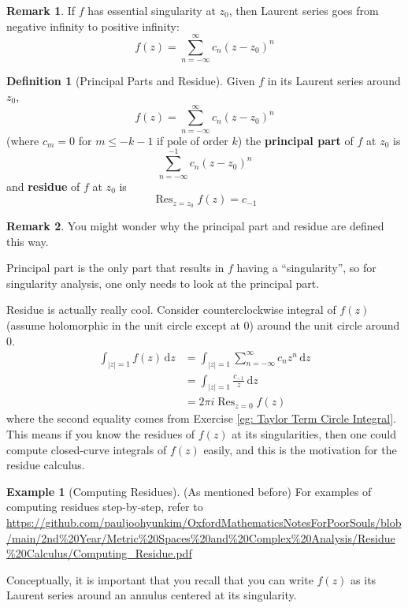 \documentclass[a4paper, 12pt]{article}
\theoremstyle{definition}
\newtheorem{definition}{Definition}
\newtheorem{example}{Example}
\newtheorem{remark}{Remark}
\numberwithin{theorem}{section}
\numberwithin{definition}{section}
\numberwithin{exercise}{section}
\numberwithin{remark}{section}
\numberwithin{figure}{section}
\numberwithin{example}{section}
\newcommand{\intd}{\,\text{d}}
\DeclareMathOperator{\res}{Res}
\begin{document}
\begin{remark}
    If $f$ has essential singularity at $z_0$, then Laurent series goes from negative infinity to positive infinity:
    \begin{equation*}
        f(z) = \sum_{n = -\infty}^{\infty} c_n (z-z_0)^n
    \end{equation*}
\end{remark}
\begin{definition}[Principal Parts and Residue]
    Given $f$ in its Laurent series around $z_0$,
    \begin{equation*}
        f(z) = \sum_{n = -\infty}^{\infty} c_n (z-z_0)^n
    \end{equation*}
    (where $c_m = 0$ for $m \leq -k-1$ if pole of order $k$)
    the \textbf{principal part} of $f$ at $z_0$ is
    \begin{equation*}
        \sum_{n = -\infty}^{-1} c_n \left( z-z_0 \right)^n
    \end{equation*}
    and \textbf{residue} of $f$ at $z_0$ is
    \begin{equation*}
        \res_{z=z_0} f(z) = c_{-1}
    \end{equation*}
\end{definition}
\begin{remark}
    You might wonder why the principal part and residue are defined this way.

    Principal part is the only part that results in $f$ having a ``singularity'',
    so for singularity analysis, one only needs to look at the principal part.

    Residue is actually really cool.
    Consider counterclockwise integral of $f(z)$ (assume holomorphic in the unit circle except at 0) around the unit circle around $0$.
    \begin{align*}
        \int_{|z| = 1} f(z) \intd z &= \int_{|z| = 1} \sum_{n=-\infty}^{\infty} c_n z^n \intd z\\
        &= \int_{|z| = 1} \frac{c_{-1}}{z} \intd z \\
        &= 2 \pi i \res_{z=0} f(z)
    \end{align*}
    where the second equality comes from Exercise \ref{eg: Taylor Term Circle Integral}.
    This means if you know the residues of $f(z)$ at its singularities,
    then one could compute closed-curve integrals of $f(z)$ easily,
    and this is the motivation for the residue calculus.
\end{remark}
\begin{example}[Computing Residues]
    (As mentioned before)
    For examples of computing residues step-by-step, refer to \url{https://github.com/pauljoohyunkim/OxfordMathematicsNotesForPoorSouls/blob/main/2nd\%20Year/Metric\%20Spaces\%20and\%20Complex\%20Analysis/Residue\%20Calculus/Computing\_Residue.pdf}

    Conceptually, it is important that you recall that you can write $f(z)$ as its
    Laurent series around an annulus centered at its singularity.
\end{example}
\end{document}

